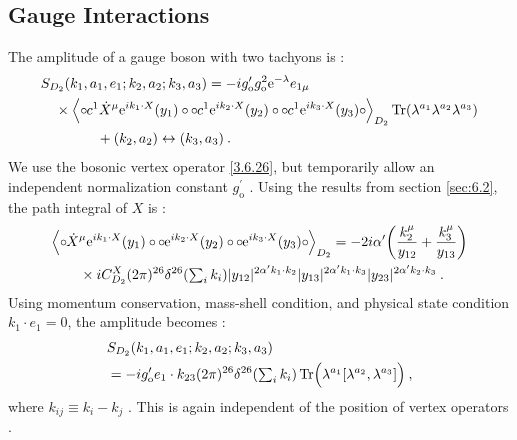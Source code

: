 \subsection*{Gauge Interactions}
The amplitude of a gauge boson with two tachyons is :
\begin{align}
	&S_{D_{2}}(k_{1}, a_{1}, e_{1} ; k_{2}, a_{2} ; k_{3}, a_{3})= 
	-i g_{\mathrm{o}}^{\prime} g_{\mathrm{o}}^{2} \mathrm{e}^{-\lambda} e_{1 \mu} \nonumber \\
	&\quad \times\Bigl\langle \circ\mkern-1mu c^{1} \dot{X}^{\mu} \mathrm{e}^{i k_{1} \cdot X}(y_{1})\circ\mkern-1mu 
	\circ\mkern-1mu  c^{1} \mathrm{e}^{i k_{2} \cdot X}(y_{2})\circ\mkern-1mu \circ\mkern-1mu c^{1} \mathrm{e}^{i k_{3} \cdot X}(y_{3})\circ\mkern-1mu\Bigr\rangle_{D_{2}} 
	\operatorname{Tr}(\lambda^{a_{1}} \lambda^{a_{2}} \lambda^{a_{3}})  \nonumber\\
	&\qquad \qquad +(k_{2}, a_{2}) \leftrightarrow(k_{3}, a_{3}) \:. \label{6.5.10}
\end{align}
We use the bosonic vertex operator \eqref{3.6.26}, but temporarily allow an independent normalization constant $g_{\mathrm{o}}^{\prime}$ . Using the results from section \ref{sec:6.2}, the path integral of $X$ is :
\begin{align}
	&\Bigl\langle \circ\mkern-1mu \dot{X}^{\mu} \mathrm{e}^{i k_{1} \cdot X}(y_{1})\circ\mkern-1mu \circ\mkern-1mu \mathrm{e}^{i k_{2} \cdot X}(y_{2})\circ\mkern-1mu 
	\circ\mkern-1mu \mathrm{e}^{i k_{3} \cdot X}(y_{3})\circ\mkern-1mu \Bigr\rangle_{D_{2}} 
	=-2 i \alpha^{\prime}\biggl(\frac{k_{2}^{\mu}}{y_{12}}+\frac{k_{3}^{\mu}}{y_{13}}\biggr) \nonumber \\
	&\qquad \times i C_{D_{2}}^{X}(2 \pi)^{26} \delta^{26}({\textstyle \sum_{i} k_{i}})
	|y_{12}|^{2 \alpha^{\prime} k_{1} \cdot k_{2}}|y_{13}|^{2 \alpha^{\prime} k_{1} \cdot k_{3}} 
	|y_{23}|^{2 \alpha^{\prime} k_{2} \cdot k_{3}} \:. \label{6.5.11}
\end{align}
Using momentum conservation, mass-shell condition, and physical state condition $k_{1} \cdot e_{1}=0$, the amplitude becomes :
\begin{align}
	&S_{D_{2}}(k_{1}, a_{1}, e_{1} ; k_{2}, a_{2} ; k_{3}, a_{3}) \nonumber \\
	&=-i g_{\mathrm{o}}^{\prime} e_{1} \cdot k_{23}(2 \pi)^{26} \delta^{26}({\textstyle \sum_{i} k_{i}}) 
	\operatorname{Tr}\Bigl(\lambda^{a_{1}}[\lambda^{a_{2}}, \lambda^{a_{3}}]\Bigr) \:, \label{6.5.12}
\end{align}
where $k_{i j} \equiv k_{i}-k_{j}$ . This is again independent of the position of vertex operators .

